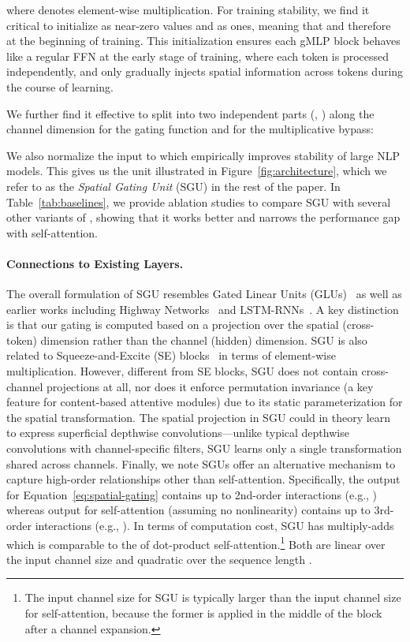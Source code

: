 \documentclass{article}
\newcommand{\gffn}{gMLP\xspace}
\begin{document}
where  denotes element-wise multiplication.
For training stability,
we find it critical to initialize  as near-zero values and  as ones,
meaning that  and therefore 
at the beginning of training. This initialization ensures each \gffn block behaves like a regular FFN at the early stage of training, where each token is processed independently,
and only gradually injects spatial information across tokens during the course of learning.

We further find it effective to split  into two independent parts (, ) along the channel dimension for the gating function and for the multiplicative bypass:

We also normalize the input to  which empirically improves stability of large NLP models.
This gives us the unit illustrated in Figure~\ref{fig:architecture}, which we refer to as the \emph{Spatial Gating Unit} (SGU) in the rest of the paper.
In Table~\ref{tab:baselines}, we provide ablation studies to compare SGU with several other variants of ,
showing that it works better and narrows the performance gap with self-attention.

\paragraph{Connections to Existing Layers.}
The overall formulation of SGU resembles Gated Linear Units (GLUs)~\cite{dauphin2017language, shazeer2020glu, wu2019pay} as well as earlier works including Highway Networks~\cite{srivastava2015highway} and LSTM-RNNs~\cite{lstm}. A key distinction is that our gating is computed based on a projection over the spatial (cross-token) dimension rather than the channel (hidden) dimension.
SGU is also related to Squeeze-and-Excite (SE) blocks~\cite{hu2018squeeze} in terms of element-wise multiplication. However, different from SE blocks, SGU does not contain cross-channel projections at all, nor does it enforce permutation invariance (a key feature for content-based attentive modules) due to its static parameterization for the spatial transformation.
The spatial projection in SGU could in theory learn to express superficial depthwise convolutions---unlike typical depthwise convolutions with channel-specific filters,
SGU learns only a single transformation shared across channels.
Finally,
we note SGUs offer an alternative mechanism to capture high-order relationships other than self-attention. Specifically, the output for Equation~\eqref{eq:spatial-gating} contains up to 2nd-order interactions (e.g., ) whereas output for self-attention (assuming no nonlinearity) contains up to 3rd-order interactions (e.g., ).
In terms of computation cost,
SGU has  multiply-adds which is comparable to the  of dot-product self-attention.\footnote{The input channel size  for SGU is typically larger than the input channel size  for self-attention, because the former is applied in the middle of the block after a channel expansion.} Both are linear over the input channel size and quadratic over the sequence length .
\end{document}
